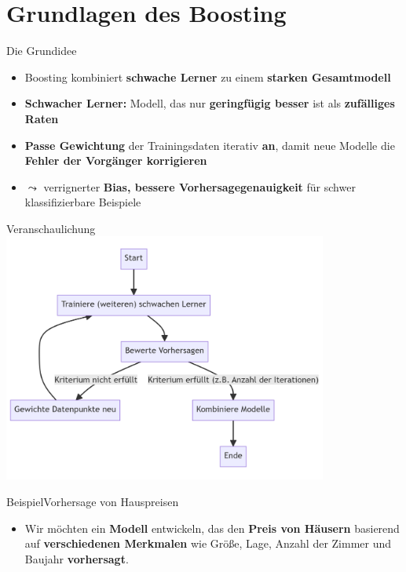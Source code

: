 \documentclass[hyperref={bookmarks=false},11pt,dvipsnames]{beamer}
\begin{document}
\section{Grundlagen des Boosting}
\begin{frame}[t]{Die Grundidee}
	\begin{itemize}
		\item <1-> Boosting kombiniert \textbf{schwache Lerner} zu einem \textbf{starken Gesamtmodell}
		\item <2-> \textbf{Schwacher Lerner:} Modell, das nur \textbf{geringfügig besser} ist als \textbf{zufälliges Raten}
		\item <3-> \textbf{Passe Gewichtung} der Trainingsdaten iterativ \textbf{an}, damit neue Modelle die \textbf{Fehler der Vorgänger korrigieren}
		\item <4-> $\leadsto$ verrignerter \textbf{Bias, bessere Vorhersagegenauigkeit} für schwer klassifizierbare Beispiele
	\end{itemize}
\end{frame}

\begin{frame}[t]{Veranschaulichung}
	\centering
	\includegraphics[width=0.8\textwidth]{../Ausarbeitung/figures/Boosting_Graph.png}
\end{frame}
\begin{frame}[t]{Beispiel}{Vorhersage von Hauspreisen}
	\begin{itemize}
		\item <1-> Wir möchten ein \textbf{Modell} entwickeln, das den \textbf{Preis von
			      Häusern} basierend auf \textbf{verschiedenen Merkmalen} wie Größe, Lage, Anzahl der
		      Zimmer und Baujahr \textbf{vorhersagt}.
	\end{itemize}
	\begin{table}
		\centering
		\resizebox{\textwidth}{!}{%
			
		}
	\end{table}


\end{frame}
\end{document}
